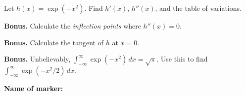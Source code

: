 \documentclass[9pt]{exam}
\begin{document}
\begin{questions}
\question[4] Let $h(x) = \exp(-x^2)$. Find $h'(x)$, $h''(x)$, and the table of variations.

\question[0] \textbf{Bonus.} Calculate the \emph{inflection points} where $h''(x) = 0$.

\question[0] \textbf{Bonus.} Calculate the tangent of $h$ at $x=0$.

\question[0] \textbf{Bonus.} Unbelievably, $\int_{-\infty}^{\infty} \exp(-x^2) \, dx = \sqrt{\pi}$. Use this to find $\int_{-\infty}^{\infty} \exp(-x^2/2) \, dx$.


\end{questions}

\begin{tcolorbox}
\textbf{Name of marker:}

\begin{center}
\gradetable[h][questions]
\end{center}

\end{tcolorbox}
\end{document}
